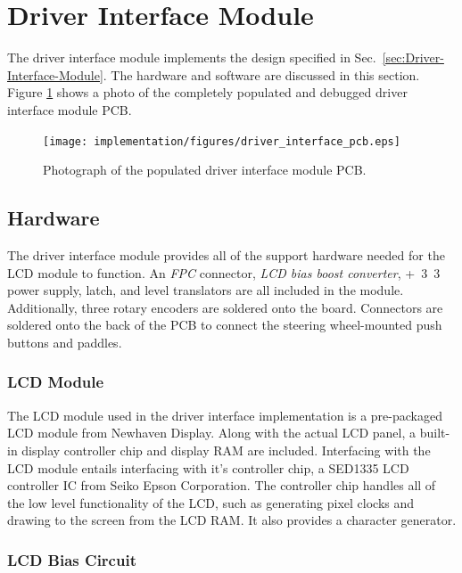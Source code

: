 \section{Driver Interface Module}

The driver interface module implements the design specified in Sec.\ \ref{sec:Driver-Interface-Module}. The hardware and software are discussed in this section. Figure \ref{fig:driver_interface_pcb} shows a photo of the completely populated and debugged driver interface module PCB.

\begin{figure}[h]
\centering
\texttt{[image: implementation/figures/driver\_interface\_pcb.eps]}
\caption{Photograph of the populated driver interface module PCB.}\label{fig:driver_interface_pcb}
\end{figure}

\subsection{Hardware}

The driver interface module provides all of the support hardware needed for the LCD module to function. An \emph{FPC} connector, \emph{LCD bias boost converter}, \unit{+3.3}{\volt} power supply, latch, and level translators are all included in the module. Additionally, three rotary encoders are soldered onto the board. Connectors are soldered onto the back of the PCB to connect the steering wheel-mounted push buttons and paddles.

\subsubsection{LCD Module}

The LCD module used in the driver interface implementation is a pre-packaged LCD module from Newhaven Display. Along with the actual LCD panel, a built-in display controller chip and display RAM are included. Interfacing with the LCD module entails interfacing with it's controller chip, a SED1335 LCD controller IC from Seiko Epson Corporation. The controller chip handles all of the low level functionality of the LCD, such as generating pixel clocks and drawing to the screen from the LCD RAM. It also provides a character generator.

\subsubsection{LCD Bias Circuit}

